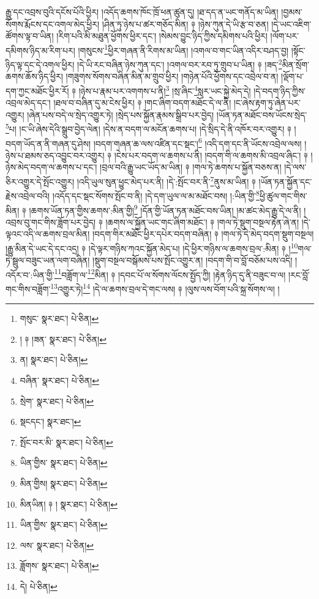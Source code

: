 རྒྱུ་དང་འབྲས་བུའི་དངོས་པོའི་ཕྱིར། །འདོད་ཆགས་ཁོང་ཁྲོ་ཕན་ཚུན་དུ། །ཐ་དད་ན་ཡང་གནོད་མ་ཡིན། །བྱམས་སོགས་རྨོངས་དང་འགལ་མེད་ཕྱིར། །ཤིན་ཏུ་ཉེས་པ་ཚར་གཅོད་མིན། ༈ །ཉེས་ཀུན་དེ་ཡི་རྩ་བ་ཅན། །དེ་ཡང་འཇིག་ཚོགས་ལྟ་བ་ཡིན། །རིག་པའི་མི་མཐུན་ཕྱོགས་ཕྱིར་དང་། །སེམས་བྱུང་ཉིད་ཀྱིས་དམིགས་པའི་ཕྱིར། །ལོག་པར་དམིགས་ཉིད་མ་རིག་པར། །གསུངས་\footnote{གསུང་  སྣར་ཐང་།  པེ་ཅིན། }ཕྱིར་གཞན་ནི་རིགས་མ་ཡིན། །འགལ་བ་གང་ཡིན་འདིར་བཤད་བྱ། །སྟོང་ཉིད་ལྟ་དང་དེ་འགལ་ཕྱིར། །དེ་ཡི་རང་བཞིན་ཉེས་ཀུན་དང་། །འགལ་བར་རབ་ཏུ་གྲུབ་པ་ཡིན། ༈ །ཟད་\footnote{། ༈ །ཟན་  སྣར་ཐང་།  པེ་ཅིན། }མིན་སྲོག་ཆགས་ཆོས་ཉིད་ཕྱིར། །གཟུགས་སོགས་བཞིན་མིན་མ་གྲུབ་ཕྱིར། །གཉེན་པོའི་ཕྱོགས་དང་འབྲེལ་བ་ན། །ལྡོག་པ་དག་ཀྱང་མཐོང་ཕྱིར་རོ། ༈ །ཉེས་པ་རྣམ་པར་འགགས་པ་ནི།\footnote{ན།  སྣར་ཐང་།  པེ་ཅིན། } །སྲ་ཞིང་\footnote{བཞིན་  སྣར་ཐང་།  པེ་ཅིན། }སླར་ཡང་སྐྱེ་མེད་དེ། །དེ་བདག་ཉིད་ཀྱིས་འབྲལ་མེད་དང་། །ཐལ་བ་བཞིན་དུ་མ་ངེས་ཕྱིར། ༈ །གང་ཞིག་བདག་མཐོང་དེ་ལ་ནི། །ང་ཞེས་རྟག་ཏུ་ཞེན་པར་འགྱུར། །ཞེན་པས་བདེ་ལ་སྲེད་འགྱུར་ཏེ། །སྲེད་པས་སྐྱོན་རྣམས་སྒྲིབ་པར་བྱེད། །ཡོན་ཏན་མཐོང་བས་ཡོངས་སྲེད་\footnote{སྲེག་  སྣར་ཐང་།  པེ་ཅིན། }པ། །ང་ཡི་ཞེས་དེའི་སྒྲུབ་བྱེད་ལེན། །དེས་ན་བདག་ལ་མངོན་ཆགས་པ། །དེ་སྲིད་དེ་ནི་འཁོར་བར་འགྱུར། ༈ །བདག་ཡོད་ན་ནི་གཞན་དུ་ཤེས། །བདག་གཞན་ཆ་ལས་འཛིན་དང་སྡང་།\footnote{སྡངདང་།  སྣར་ཐང་། } །འདི་དག་དང་ནི་ཡོངས་འབྲེལ་ལས། །ཉེས་པ་ཐམས་ཅད་འབྱུང་བར་འགྱུར། ༈ །ངེས་པར་བདག་ལ་ཆགས་པ་ནི། །བདག་གི་ལ་ཆགས་མི་འབྲལ་ཞིང་། ༈ །ཉེས་མེད་བདག་ལ་ཆགས་པ་དང་། །བྲལ་བའི་རྒྱུ་ཡང་ཡོད་མ་ཡིན། ༈ །གལ་ཏེ་ཆགས་པ་སྐྱོན་བཅས་ན། །དེ་ལས་ཅིར་འགྱུར་དེ་སྤོང་འགྱུར། །འདི་ཡུལ་སུན་ཕྱུང་མེད་པར་ནི། །དེ་:སྤོང་བར་ནི་\footnote{སྤོང་བར་མི་  སྣར་ཐང་།  པེ་ཅིན། }ནུས་མ་ཡིན། ༈ །ཡོན་ཏན་སྐྱོན་དང་རྗེས་འབྲེལ་བའི། །འདོད་དང་སྡང་སོགས་སྤོང་བ་ནི། །དེ་དག་ཡུལ་ལ་མ་མཐོང་བས། །:ཡིན་གྱི་\footnote{ཡིན་གྱིས་  སྣར་ཐང་།  པེ་ཅིན། }ཕྱི་ཚུལ་གང་གིས་མིན། ༈ །ཆགས་ཡོན་ཏན་གྱིས་ཆགས་:མིན་གྱི།\footnote{མིན་གྱིས།  སྣར་ཐང་།  པེ་ཅིན། } །དོན་གྱི་ཡོན་ཏན་མཐོང་བས་ཡིན། །མ་ཚང་མེད་རྒྱུ་དེ་ལ་ནི། །འབྲས་བུ་གང་གིས་ཟློག་པར་བྱེད། ༈ །ཆགས་ལ་སྐྱོན་ཡང་གང་ཞིག་མཐོང་། ༈ །གལ་ཏེ་སྡུག་བསྔལ་རྟེན་ཞེ་ན། །དེ་ལྟའང་འདི་ལ་ཆགས་བྲལ་མིན། །བདག་གིར་མཐོང་ཕྱིར་དཔེར་བདག་བཞིན། ༈ །གལ་ཏེ་དེ་མེད་བདག་སྡུག་བསྔལ། །རྒྱུ་མིན་དེ་ཡང་དེ་དང་འདྲ། ༈ །དེ་ལྟར་གཉིས་ཀའང་སྐྱོན་མེད་པ། །དེ་ཕྱིར་གཉིས་ལ་ཆགས་བྲལ་:མིན། ༈ །\footnote{མིནཡིན། ༈ །  སྣར་ཐང་།  པེ་ཅིན། }གལ་ཏེ་སྦྲུལ་བཟུང་ཡན་ལག་བཞིན། །སྡུག་བསྔལ་བསྒོམས་པས་སྤོང་འགྱུར་ན། །བདག་གི་བ་བློ་བཅོམ་པས་འདི། །འདོར་བ་:ཡིན་གྱི་\footnote{ཡིན་གྱིས་  སྣར་ཐང་།  པེ་ཅིན། }བཟློག་ལ་\footnote{ལས་  སྣར་ཐང་།  པེ་ཅིན། }མིན། ༈ །དབང་པོ་ལ་སོགས་ལོངས་སྤྱོད་ཀྱི། །རྟེན་ཉིད་དུ་ནི་བཟུང་བ་ལ། །རང་བློ་གང་གིས་བཟློག་\footnote{ཟློགས་  སྣར་ཐང་།  པེ་ཅིན། }འགྱུར་ཏེ།\footnote{དེ།  པེ་ཅིན། } །དེ་ལ་ཆགས་བྲལ་དེ་གང་ལས། ༈ །ལུས་ལས་བོག་པའི་སྐྲ་སོགས་ལ། །
